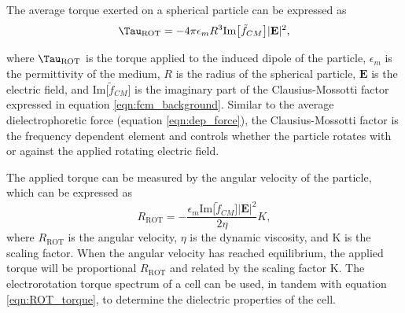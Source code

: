  \par The average torque exerted on a spherical particle can be expressed as \cite{morgan_single_2007}
 \begin{equation}
    \Tau_{\text{ROT}} = -4\pi \epsilon_m R^3 \text{Im}\big[\tilde{f}_{CM}\big]|\textbf{E}|^2,
    \label{eqn:ROT_torque}
 \end{equation}
 
 \noindent where $\Tau_{\text{ROT}}$ is the torque applied to the induced dipole of the particle, $\epsilon_m$ is the permittivity of the medium, $R$ is the radius of the spherical particle, $\textbf{E}$ is the electric field, and $\text{Im}\big[\tilde{f}_{CM}\big]$ is the imaginary part of the Clausius-Mossotti factor expressed in equation \ref{eqn:fcm_background}. Similar to the average dielectrophoretic force (equation \ref{eqn:dep_force}), the Clausius-Mossotti factor is the frequency dependent element and controls whether the particle rotates with or against the applied rotating electric field.
 
 \par The applied torque can be measured by the angular velocity of the particle, which can be expressed as \cite{morgan_ac_2003}
 \begin{equation}
     R_{\text{ROT}} = - \frac{\epsilon_m\text{Im}\big[\tilde{f}_{CM}\big]|\textbf{E}|^2}{2\eta}K, 
 \end{equation}
 \noindent where $R_{\text{ROT}}$ is the angular velocity, $\eta$ is the dynamic viscosity, and K is the scaling factor. When the angular velocity has reached equilibrium, the applied torque will be proportional $R_{\text{ROT}}$ and related by the scaling factor K. The electrorotation torque spectrum of a cell can be used, in tandem with equation \ref{eqn:ROT_torque}, to determine the dielectric properties of the cell. 
 
